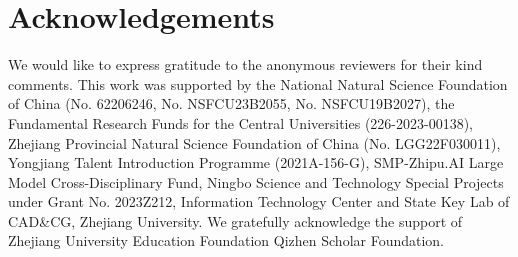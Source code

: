 \documentclass{article}
\begin{document}
\section*{Acknowledgements}

We would like to express gratitude to the anonymous reviewers for their kind comments. 
This work was supported by the National Natural Science Foundation of China (No. 62206246, No. NSFCU23B2055, No. NSFCU19B2027), the Fundamental Research Funds for the Central Universities (226-2023-00138), Zhejiang Provincial Natural Science Foundation of China (No. LGG22F030011), Yongjiang Talent Introduction Programme (2021A-156-G), SMP-Zhipu.AI Large Model Cross-Disciplinary Fund, Ningbo Science and Technology Special Projects under Grant No. 2023Z212, Information Technology Center and State Key Lab of CAD\&CG, Zhejiang University.
We gratefully acknowledge the support of Zhejiang University Education Foundation Qizhen Scholar Foundation.







%
\end{document}
